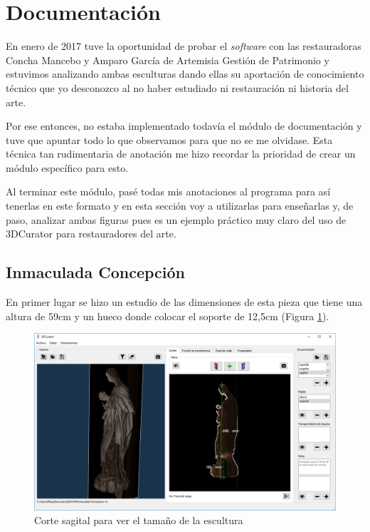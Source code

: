 \section{Documentación}

En enero de 2017 tuve la oportunidad de probar el \textit{software} con las restauradoras Concha Mancebo y Amparo García de Artemisia Gestión de Patrimonio y estuvimos analizando ambas esculturas dando ellas su aportación de conocimiento técnico que yo desconozco al no haber estudiado ni restauración ni historia del arte.

Por ese entonces, no estaba implementado todavía el módulo de documentación y tuve que apuntar todo lo que observamos para que no se me olvidase. Esta técnica tan rudimentaria de anotación me hizo recordar la prioridad de crear un módulo específico para esto.

Al terminar este módulo, pasé todas mis anotaciones al programa para así tenerlas en este formato y en esta sección voy a utilizarlas para enseñarlas y, de paso, analizar ambas figuras pues es un ejemplo práctico muy claro del uso de 3DCurator para restauradores del arte.

\subsection{Inmaculada Concepción}

En primer lugar se hizo un estudio de las dimensiones de esta pieza que tiene una altura de 59cm y un hueco donde colocar el soporte de 12,5cm (Figura \ref{fig:resultados/documentacion/inmaculada-concepcion/sagital}).

\begin{figure}[H]
	\centering
	\includegraphics[width=12.5cm]{imagenes/resultados/documentacion/inmaculada-concepcion/sagital}
	\caption{Corte sagital para ver el tamaño de la escultura}
	\label{fig:resultados/documentacion/inmaculada-concepcion/sagital}
\end{figure}


